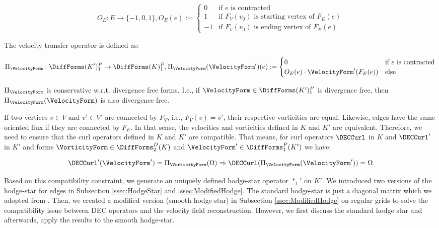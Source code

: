 \begin{equation}
O_E : E \rightarrow \{-1,0,1\}, O_E(e) :=
\begin{cases}
0 & \text{if } e \text{ is contracted} \\
1 & \text{if } F_V(v_0) \text{ is starting vertex of } F_E(e) \\
-1 & \text{if } F_V(v_0) \text{ is ending vertex of } F_E(e)
\end{cases}
\end{equation}

The velocity transfer operator is defined as:

\begin{equation}
\Pi_\VelocityForm : \DiffForms(K')^P_1 \rightarrow \DiffForms(K)^P_1, \Pi_\VelocityForm(\VelocityForm')(e) := 
\begin{cases}
0 & \text{if } e \text{ is contracted} \\
O_E(e) \cdot \VelocityForm'( F_E(e) ) & \text{else}
\end{cases}
\end{equation}

$\Pi_\VelocityForm$ is conservative w.r.t. divergence free forms.
I.e., if $\VelocityForm \in \DiffForms(K')^P_1$ is divergence free, then $\Pi_\VelocityForm(\VelocityForm)$ is also divergence free.

If two vertices $v \in V$ and $v' \in V'$ are connected by $F_V$, i.e., $F_V(v) = v'$, their respective vorticities are equal.
Likewise, edges have the same oriented flux if they are connected by $F_E$.
In that sense, the velocities and vorticities defined in $K$ and $K'$ are equivalent.
Therefore, we need to ensure that the curl operators defined in $K$ and $K'$ are compatible.
That means, for curl operators $\DECCurl$ in $K$ and $\DECCurl'$ in $K'$ and forms $\VorticityForm \in \DiffForms^D_2(K)$ and $\VelocityForm' \in \DiffForms^P_1(K')$ we have:

\begin{equation}
\DECCurl'(\VelocityForm') = \Pi_\VorticityForm(\Omega) \Rightarrow \DECCurl(\Pi_\VelocityForm( \VelocityForm' )) = \Omega
\end{equation} 

Based on this compatibility constraint, we generate an uniquely defined hodge-star operator $*_1'$ on $K'$.
We introduced two versions of the hodge-star for edges in Subsection \ref{ssec:HodgeStar} and \ref{ssec:ModifiedHodge}.
The standard hodge-star is just a diagonal matrix which we adopted from .
Then, we created a modified version (smooth hodge-star) in Subsection \ref{ssec:ModifiedHodge} on regular grids to solve the compatibility issue between DEC operators and the velocity field reconstruction.
However, we first discuss the standard hodge star and afterwards, apply the results to the smooth hodge-star.

